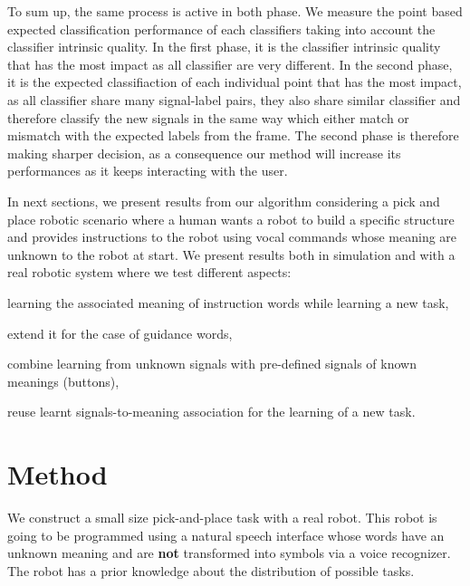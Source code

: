 To sum up, the same process is active in both phase. We measure the point based expected classification performance of each classifiers taking into account the classifier intrinsic quality. In the first phase, it is the classifier intrinsic quality that has the most impact as all classifier are very different. In the second phase, it is the expected classifiaction of each individual point that has the most impact, as all classifier share many signal-label pairs, they also share similar classifier and therefore classify the new signals in the same way which either match or mismatch with the expected labels from the frame. The second phase is therefore making sharper decision, as a consequence our method will increase its performances as it keeps interacting with the user.

\transition

In next sections, we present results from our algorithm considering a pick and place robotic scenario where a human wants a robot to build a specific structure and provides instructions to the robot using vocal commands whose meaning are unknown to the robot at start. We present results both in simulation and with a real robotic system where we test different aspects: \begin{inparaenum}[a)] \item learning the associated meaning of instruction words while learning a new task, \item extend it for the case of guidance words, \item combine learning from unknown signals with pre-defined signals of known meanings (buttons), \item reuse learnt signals-to-meaning association for the learning of a new task. \end{inparaenum}

\section{Method}

We construct a small size pick-and-place task with a real robot. This robot is going to be programmed using a natural speech interface whose words have an unknown meaning and are \textbf{not} transformed into symbols via a voice recognizer. The robot has a prior knowledge about the distribution of possible tasks.

